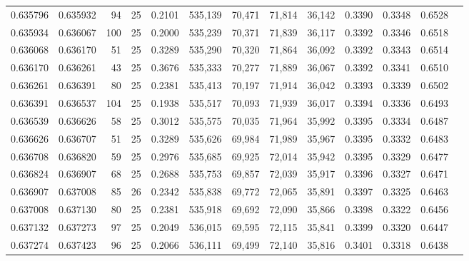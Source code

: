 \begin{tabular}{rrrrrrrrrrrrr}
0.635796 & 0.635932 &    94 &  25 &                                     0.2101 & 535,139 &  70,471 &  71,814 &  36,142 & 0.3390 & 0.3348 & 0.6528 \\
0.635934 & 0.636067 &   100 &  25 &                                     0.2000 & 535,239 &  70,371 &  71,839 &  36,117 & 0.3392 & 0.3346 & 0.6518 \\
0.636068 & 0.636170 &    51 &  25 &                                     0.3289 & 535,290 &  70,320 &  71,864 &  36,092 & 0.3392 & 0.3343 & 0.6514 \\
0.636170 & 0.636261 &    43 &  25 &                                     0.3676 & 535,333 &  70,277 &  71,889 &  36,067 & 0.3392 & 0.3341 & 0.6510 \\
0.636261 & 0.636391 &    80 &  25 &                                     0.2381 & 535,413 &  70,197 &  71,914 &  36,042 & 0.3393 & 0.3339 & 0.6502 \\
0.636391 & 0.636537 &   104 &  25 &                                     0.1938 & 535,517 &  70,093 &  71,939 &  36,017 & 0.3394 & 0.3336 & 0.6493 \\
0.636539 & 0.636626 &    58 &  25 &                                     0.3012 & 535,575 &  70,035 &  71,964 &  35,992 & 0.3395 & 0.3334 & 0.6487 \\
0.636626 & 0.636707 &    51 &  25 &                                     0.3289 & 535,626 &  69,984 &  71,989 &  35,967 & 0.3395 & 0.3332 & 0.6483 \\
0.636708 & 0.636820 &    59 &  25 &                                     0.2976 & 535,685 &  69,925 &  72,014 &  35,942 & 0.3395 & 0.3329 & 0.6477 \\
0.636824 & 0.636907 &    68 &  25 &                                     0.2688 & 535,753 &  69,857 &  72,039 &  35,917 & 0.3396 & 0.3327 & 0.6471 \\
0.636907 & 0.637008 &    85 &  26 &                                     0.2342 & 535,838 &  69,772 &  72,065 &  35,891 & 0.3397 & 0.3325 & 0.6463 \\
0.637008 & 0.637130 &    80 &  25 &                                     0.2381 & 535,918 &  69,692 &  72,090 &  35,866 & 0.3398 & 0.3322 & 0.6456 \\
0.637132 & 0.637273 &    97 &  25 &                                     0.2049 & 536,015 &  69,595 &  72,115 &  35,841 & 0.3399 & 0.3320 & 0.6447 \\
0.637274 & 0.637423 &    96 &  25 &                                     0.2066 & 536,111 &  69,499 &  72,140 &  35,816 & 0.3401 & 0.3318 & 0.6438 \\

\end{tabular}
